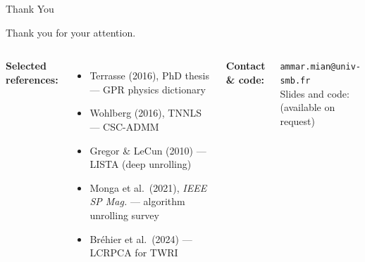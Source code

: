 \begin{frame}{Thank You}

  \begin{center}
    \large
    Thank you for your attention.
  \end{center}

  \vspace{0.8em}

  \begin{columns}[T]

      \textbf{Selected references:}
      \vspace{0.3em}
      {\footnotesize
      \begin{itemize}
        \item Terrasse (2016), PhD thesis ---
              GPR physics dictionary
        \item Wohlberg (2016), TNNLS ---
              CSC-ADMM
        \item Gregor \& LeCun (2010) ---
              LISTA (deep unrolling)
        \item Monga et al.\ (2021),
              \textit{IEEE SP Mag.} ---
              algorithm unrolling survey
        \item Br\'{e}hier et al.\ (2024) ---
              LCRPCA for TWRI
      \end{itemize}
      }

      \vspace{0.2em}
      \textbf{Contact \& code:}
      \vspace{0.3em}

      \begin{shibuitip}
        \footnotesize
        \texttt{ammar.mian@univ-smb.fr}\\[0.4em]
        Slides and code:\\
        (available on request)
      \end{shibuitip}

  \end{columns}

  \vspace{1.2em}
  \begin{center}
    \large{}
  \end{center}

\end{frame}
